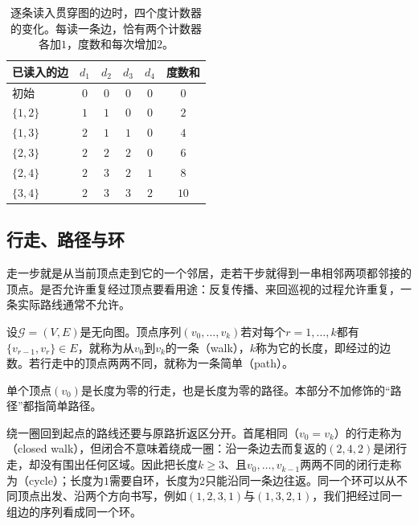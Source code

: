 \begin{table}[!htb]
  \centering
  \caption{逐条读入贯穿图的边时，四个度计数器的变化。每读一条边，恰有两个计数器各加$1$，度数和每次增加$2$。}
  \label{tab:graph-conn-degree-trace}
  \small
  \begin{tabular}{@{}lccccc@{}}
    \toprule
    已读入的边 & $d_1$ & $d_2$ & $d_3$ & $d_4$ & 度数和\\
    \midrule
    初始 & $0$ & $0$ & $0$ & $0$ & $0$\\
    $\{1,2\}$ & $1$ & $1$ & $0$ & $0$ & $2$\\
    $\{1,3\}$ & $2$ & $1$ & $1$ & $0$ & $4$\\
    $\{2,3\}$ & $2$ & $2$ & $2$ & $0$ & $6$\\
    $\{2,4\}$ & $2$ & $3$ & $2$ & $1$ & $8$\\
    $\{3,4\}$ & $2$ & $3$ & $3$ & $2$ & $10$\\
    \bottomrule
  \end{tabular}
\end{table}

\subsection{行走、路径与环}
\label{sec:graph-conn-walks-paths}

走一步就是从当前顶点走到它的一个邻居，走若干步就得到一串相邻两项都邻接的顶点。是否允许重复经过顶点要看用途：反复传播、来回巡视的过程允许重复，一条实际路线通常不允许。

\begin{definition}[行走与路径]
\label{def:graph-conn-walk-path}
设$\mathcal G=(V,E)$是无向图。顶点序列$(v_0,\ldots,v_k)$若对每个$r=1,\ldots,k$都有$\{v_{r-1},v_r\}\in E$，就称为从$v_0$到$v_k$的一条（walk），$k$称为它的长度，即经过的边数。若行走中的顶点两两不同，就称为一条简单（path）。
\end{definition}

单个顶点$(v_0)$是长度为零的行走，也是长度为零的路径。本部分不加修饰的“路径”都指简单路径。

绕一圈回到起点的路线还要与原路折返区分开。首尾相同（$v_0=v_k$）的行走称为（closed walk），但闭合不意味着绕成一圈：沿一条边去而复返的$(2,4,2)$是闭行走，却没有围出任何区域。因此把长度$k\geq3$、且$v_0,\ldots,v_{k-1}$两两不同的闭行走称为（cycle）；长度为$1$需要自环，长度为$2$只能沿同一条边往返。同一个环可以从不同顶点出发、沿两个方向书写，例如$(1,2,3,1)$与$(1,3,2,1)$，我们把经过同一组边的序列看成同一个环。

